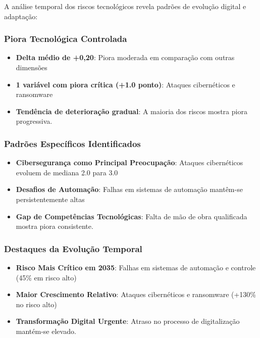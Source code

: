 \documentclass[
  portuguese,
  letterpaper,
  DIV=11,
  numbers=noendperiod]{scrreprt}
\providecommand{\tightlist}{%
  \setlength{\itemsep}{0pt}\setlength{\parskip}{0pt}}
\begin{document}
A análise temporal dos riscos tecnológicos revela padrões de evolução
digital e adaptação:

\subsubsection{Piora Tecnológica
Controlada}\label{piora-tecnoluxf3gica-controlada}

\begin{itemize}
\tightlist
\item
  \textbf{Delta médio de +0,20}: Piora moderada em comparação com outras
  dimensões
\item
  \textbf{1 variável com piora crítica (+1.0 ponto)}: Ataques
  cibernéticos e ransomware
\item
  \textbf{Tendência de deterioração gradual}: A maioria dos riscos
  mostra piora progressiva.
\end{itemize}

\subsubsection{Padrões Específicos
Identificados}\label{padruxf5es-especuxedficos-identificados-4}

\begin{itemize}
\tightlist
\item
  \textbf{Cibersegurança como Principal Preocupação}: Ataques
  cibernéticos evoluem de mediana 2.0 para 3.0
\item
  \textbf{Desafios de Automação}: Falhas em sistemas de automação
  mantêm-se persistentemente altas
\item
  \textbf{Gap de Competências Tecnológicas}: Falta de mão de obra
  qualificada mostra piora consistente.
\end{itemize}

\subsubsection{Destaques da Evolução
Temporal}\label{destaques-da-evoluuxe7uxe3o-temporal-3}

\begin{itemize}
\tightlist
\item
  \textbf{Risco Mais Crítico em 2035}: Falhas em sistemas de automação e
  controle (45\% em risco alto)
\item
  \textbf{Maior Crescimento Relativo}: Ataques cibernéticos e ransomware
  (+130\% no risco alto)
\item
  \textbf{Transformação Digital Urgente}: Atraso no processo de
  digitalização mantém-se elevado.
\end{itemize}
\end{document}
